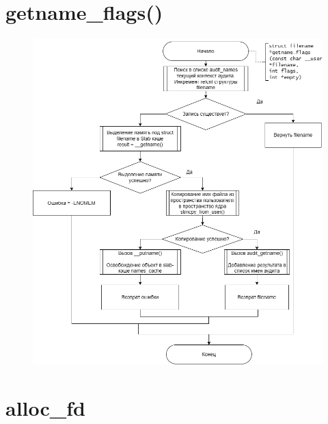 \documentclass[12pt]{report}
\begin{document}
	\section{getname\_flags()}
	
	\begin{figure}[H]
		\centering
		\includegraphics[scale=0.5]{get_name_flags}
	\end{figure}
	
	\section{alloc\_fd}
	
\end{document}
